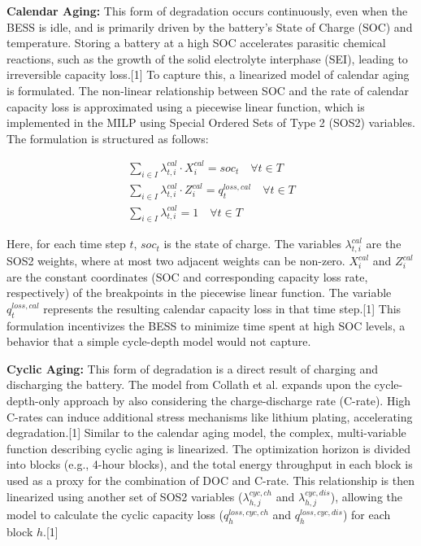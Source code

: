 \textbf{Calendar Aging:} This form of degradation occurs continuously, even when the BESS is idle, and is primarily driven by the battery's State of Charge (SOC) and temperature. Storing a battery at a high SOC accelerates parasitic chemical reactions, such as the growth of the solid electrolyte interphase (SEI), leading to irreversible capacity loss.[1] To capture this, a linearized model of calendar aging is formulated. The non-linear relationship between SOC and the rate of calendar capacity loss is approximated using a piecewise linear function, which is implemented in the MILP using Special Ordered Sets of Type 2 (SOS2) variables. The formulation is structured as follows:

\begin{gather}
\sum_{i\in I}\lambda_{t,i}^{cal} \cdot X_{i}^{cal} = soc_{t} \quad \forall t \in T \\
\sum_{i\in I}\lambda_{t,i}^{cal} \cdot Z_{i}^{cal} = q_{t}^{loss,cal} \quad \forall t \in T \\
\sum_{i\in I}\lambda_{t,i}^{cal} = 1 \quad \forall t \in T
\end{gather}

Here, for each time step $t$, $soc_t$ is the state of charge. The variables $\lambda_{t,i}^{cal}$ are the SOS2 weights, where at most two adjacent weights can be non-zero. $X_{i}^{cal}$ and $Z_{i}^{cal}$ are the constant coordinates (SOC and corresponding capacity loss rate, respectively) of the breakpoints in the piecewise linear function. The variable $q_{t}^{loss,cal}$ represents the resulting calendar capacity loss in that time step.[1] This formulation incentivizes the BESS to minimize time spent at high SOC levels, a behavior that a simple cycle-depth model would not capture.

\textbf{Cyclic Aging:} This form of degradation is a direct result of charging and discharging the battery. The model from Collath et al. expands upon the cycle-depth-only approach by also considering the charge-discharge rate (C-rate). High C-rates can induce additional stress mechanisms like lithium plating, accelerating degradation.[1] Similar to the calendar aging model, the complex, multi-variable function describing cyclic aging is linearized. The optimization horizon is divided into blocks (e.g., 4-hour blocks), and the total energy throughput in each block is used as a proxy for the combination of DOC and C-rate. This relationship is then linearized using another set of SOS2 variables ($\lambda_{h,j}^{cyc,ch}$ and $\lambda_{h,j}^{cyc,dis}$), allowing the model to calculate the cyclic capacity loss ($q_{h}^{loss,cyc,ch}$ and $q_{h}^{loss,cyc,dis}$) for each block $h$.[1]

